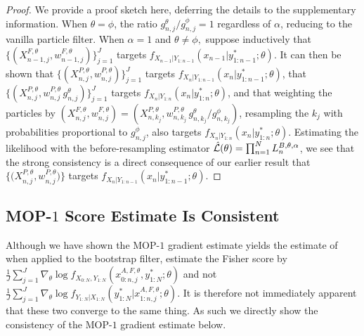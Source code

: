 \documentclass[9pt,twocolumn,pnasresearcharticle]{pnas-new}
\newcommand\arxiv[2]{#2} %
\begin{document}

\begin{proof}
    We provide a proof sketch here, deferring the details to \arxiv{Appendix~\ref{appendix:targeting}}{the supplementary information}. 
    When $\theta=\phi$, the ratio ${g_{n,j}^\theta}/{g_{n,j}^\phi}=1$ regardless of $\alpha$, reducing to the vanilla particle filter.
    When $\alpha=1$ and $\theta\neq\phi,$ suppose inductively that $\{(X^{F,\theta}_{n-1,j},w^{F,\theta}_{n-1,j})\}_{j=1}^J$ targets $f_{X_{n-1}|Y_{1:n-1}}(x_{n-1}|y^*_{1:n-1};\theta)$.
    It can then be shown that $\{(X^{P,\theta}_{n,j},w^{P,\theta}_{n,j})\}_{j=1}^J$ targets $f_{X_{n}|Y_{1:n-1}}(x_{n}|y^*_{1:n-1};\theta)$, that $\{(X^{P,\theta}_{n,j},w^{P,\theta}_{n,j} \, g^\theta_{n,j} )\}_{j=1}^J$ targets  $f_{X_{n}|Y_{1:n}}(x_{n}|y^*_{1:n};\theta)$, and that weighting the particles by $(X^{F,\theta}_{n,j},w^{F,\theta}_{n,j}) = (X^{P,\theta}_{n,k_j}, w^{P,\theta}_{n,k_j} \, g^\theta_{n,k_j} \big/ g^\phi_{n,k_j})$,
    resampling the $k_j$ with probabilities proportional to $g^\phi_{n,j}$, also targets $f_{X_{n}|Y_{1:n}}(x_{n}|y^*_{1:n};\theta)$.
    Estimating the likelihood with the before-resampling estimator $\hat{\mathcal{L}}(\theta) = \prod_{n=1}^N L_n^{B,\theta,\alpha}$, we see that the strong consistency is a direct consequence of our earlier result that $\{ \big(X^{P,\theta}_{n,j},w^{P,\theta}_{n,j}\big) \}$ targets $f_{X_{n}|Y_{1:n-1}}(x_{n}|y^*_{1:n-1};\theta)$. 
\end{proof}

\arxiv{}{\vspace*{-4mm}}
\subsection{MOP-$1$ Score Estimate Is Consistent}

Although we have shown the MOP-$1$ gradient estimate yields the estimate of \cite{poyiadjis11, scibior21} when applied to the bootstrap filter, \cite{poyiadjis11, scibior21} estimate the Fisher score by 
$\frac{1}{J}\sum_{j=1}^J \nabla_\theta \log f_{X_{0:N}, Y_{1:N}}(x_{0:n,j}^{A, F,\theta}, y_{1:N}^* ; \theta)$ and not
$\frac{1}{J}\sum_{j=1}^J \nabla_\theta \log f_{Y_{1:N}| X_{1:N}}(y_{1:N}^* | x_{1:n,j}^{A, F,\theta}; \theta).$
It is therefore not immediately apparent that these two converge to the same thing. As such we directly show the consistency of the MOP-$1$ gradient estimate below. 
\end{document}

